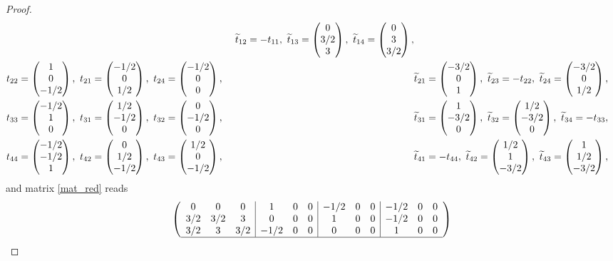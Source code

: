 \documentclass[11pt]{article}
\begin{document}
\begin{proof}
\begin{align*}
   &&\widetilde t_{12}=-t_{11},\ \widetilde t_{13}=\begin{pmatrix}0\\3/2\\3\end{pmatrix},\ \widetilde t_{14}=\begin{pmatrix}0\\3\\3/2\end{pmatrix},\\
   &t_{22}=\begin{pmatrix}1\\0\\-1/2\end{pmatrix},\ t_{21}=\begin{pmatrix}-1/2\\0\\1/2\end{pmatrix},\ t_{24}=\begin{pmatrix}-1/2\\0\\0\end{pmatrix},\
   &&\widetilde t_{21}=\begin{pmatrix}-3/2\\0\\1\end{pmatrix},\ \widetilde t_{23}=-t_{22},\ \widetilde t_{24}=\begin{pmatrix}-3/2\\0\\1/2\end{pmatrix},\\
   &t_{33}=\begin{pmatrix}-1/2\\1\\0\end{pmatrix},\ t_{31}=\begin{pmatrix}1/2\\-1/2\\0\end{pmatrix},\ t_{32}=\begin{pmatrix}0\\-1/2\\0\end{pmatrix},\
   &&\widetilde t_{31}=\begin{pmatrix}1\\-3/2\\0\end{pmatrix},\ \widetilde t_{32}=\begin{pmatrix}1/2\\-3/2\\0\end{pmatrix},\ \widetilde t_{34}=-t_{33},\\
   &t_{44}=\begin{pmatrix}-1/2\\-1/2\\1\end{pmatrix},\ t_{42}=\begin{pmatrix}0\\1/2\\-1/2\end{pmatrix},\ t_{43}=\begin{pmatrix}1/2\\0\\-1/2\end{pmatrix},\
   &&\widetilde t_{41}=-t_{44},\ \widetilde t_{42}=\begin{pmatrix}1/2\\1\\-3/2\end{pmatrix},\ \widetilde t_{43}=\begin{pmatrix}1\\1/2\\-3/2\end{pmatrix},
\end{align*}
and matrix \eqref{mat_red} reads
\[
\begin{pmatrix}
\begin{array}{ccc|ccc|ccc|ccc}
%
%
%
  0  & 0  & 0  &     1   & 0  & 0    &     -1/2 & 0 & 0        & -1/2 & 0 & 0 \\
  3/2& 3/2& 3  &     0   & 0  & 0    &      1   & 0 & 0        & -1/2 & 0 & 0 \\
  3/2& 3  & 3/2&     -1/2& 0  & 0    &      0   & 0 & 0        & 1    & 0 & 0 \\\hline


\end{array}
\end{pmatrix}\]
\end{proof}
\end{document}
